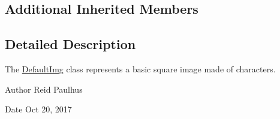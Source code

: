 \subsection*{Additional Inherited Members}


\subsection{Detailed Description}
The \hyperlink{classDefaultImg}{Default\-Img} class represents a basic square image made of characters. 

\begin{DoxyAuthor}{Author}
Reid Paulhus 
\end{DoxyAuthor}
\begin{DoxyDate}{Date}
Oct 20, 2017 
\end{DoxyDate}


